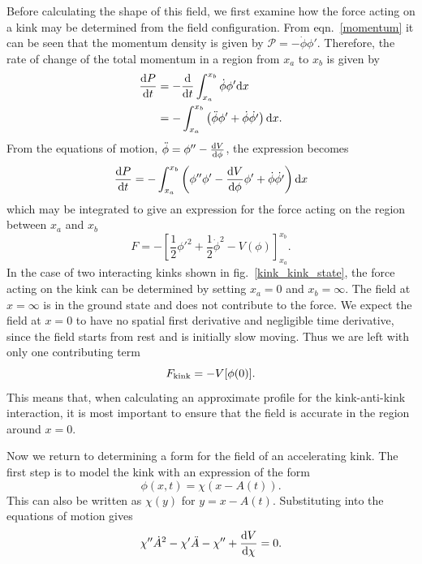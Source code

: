 \documentclass[11pt, oneside,titlepage]{article}  	%
\numberwithin{equation}{section}
\newcommand{\drv}{\ensuremath{\textup{d}}}
\begin{document}
Before calculating the shape of this field, we first examine how the force acting on a kink may be determined from the field configuration. From eqn.~\ref{momentum} it can be seen that the momentum density is given by $\mathcal{P} = -\dot{\phi}\phi'$. Therefore, the rate of change of the total momentum in a region from $x_a$ to $x_b$ is given by
\begin{align}
\frac{\drv P}{\drv t} &= -\frac{\drv}{\drv t} \int_{x_a}^{x_b} \dot{\phi}\phi' \drv x \\
 &= - \int_{x_a}^{x_b} \left ( \ddot{\phi}\phi' + \dot{\phi}\dot{\phi'} \right )\drv x.
\end{align}
From the equations of motion, $\ddot{\phi} = \phi'' - \frac{\drv V}{\drv\phi}$, the expression becomes
 \begin{equation}
\frac{\drv P}{\drv t} = - \int_{x_a}^{x_b} \left ( \phi'' \phi' - \frac{\drv V}{\drv\phi} \phi' + \dot{\phi}\dot{\phi'} \right )\drv x
\end{equation}
which may be integrated to give an expression for the force acting on the region between $x_a$ and $x_b$
\begin{equation}
F = -\left [ \frac{1}{2} \phi'^2 + \frac{1}{2} \dot{\phi}^2 - V(\phi) \right ]_{x_a}^{x_b}.
 \end{equation}
 In the case of two interacting kinks shown in fig.~\ref{kink_kink_state}, the force acting on the kink can be determined by setting $x_a = 0$ and $x_b = \infty$. The field at $ x =\infty$ is in the ground state and does not contribute to the force. We expect the field at $x=0$ to have no spatial first derivative and negligible time derivative, since the field starts from rest and is initially slow moving. Thus we are left with only one contributing term
 \begin{equation} \label{force}
F_\textup{kink} = - V[\phi(0)].
 \end{equation}
 This means that, when calculating an approximate profile for the kink-anti-kink interaction, it is most important to ensure that the field is accurate in the region around $x=0$.\par
 Now we return to determining a form for the field of an accelerating kink. The first step is to model the kink with an expression of the form
 \begin{equation}
 \phi(x,t) = \chi\left( x - A(t)\right).
 \end{equation}
 This can also be written as $\chi\left( y\right)$ for $y = x-A(t)$. Substituting into the equations of motion gives
 \begin{equation}
 \chi '' \dot{A}^2 - \chi'\ddot{A} - \chi '' + \frac{\drv V }{\drv \chi}=0.
 \end{equation}
\end{document}
